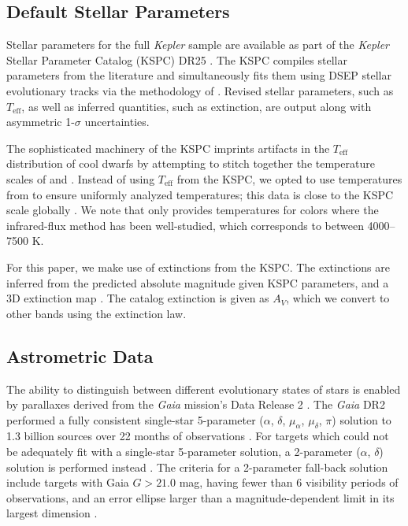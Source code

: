\documentclass[twocolumn]{aastex6}
\newcommand{\Kepler}{\mbox{\textit{Kepler}}}
\newcommand{\Gaia}{\mbox{\textit{Gaia}}}
\newcommand{\Teff}{\ensuremath{T_{\textrm{eff}}}}
\begin{document}
\subsection{Default Stellar Parameters}

Stellar parameters for the full \Kepler{} sample are available as part of the
\Kepler{} Stellar Parameter Catalog (KSPC) DR25 \citep{Mathur17}. The KSPC
compiles stellar parameters from the literature and simultaneously fits them
using DSEP stellar evolutionary tracks \citep{Dotter08} via the methodology of
\citet{Huber14}. Revised stellar parameters, such as \Teff, as well as 
inferred quantities, such as extinction, are output along with asymmetric
1-\(\sigma\) uncertainties. 

The sophisticated machinery of the KSPC imprints artifacts in the \Teff{}
distribution of cool dwarfs by attempting to stitch together the temperature
scales of \citet{Pinsonneault12} and \citet{Dressing13}. Instead of using
\Teff{} from the KSPC, we opted to use temperatures from 
\citet{Pinsonneault12} to ensure uniformly analyzed temperatures; this data is
close to the KSPC scale globally \citep{Huber17}. We note that 
\citet{Pinsonneault12} only provides temperatures for colors where the
infrared-flux method has been well-studied, which corresponds to between
4000--7500 K.

For this paper, we make use of extinctions from the KSPC\@. The
extinctions are inferred from the predicted absolute magnitude given KSPC 
parameters, and a 3D extinction map \citep{Amores05}. The catalog extinction 
is given as \(A_V\), which we convert to other bands using the 
\citet{Cardelli89} extinction law. 

\subsection{Astrometric Data}

The ability to distinguish between different evolutionary states of stars is
enabled by parallaxes derived from the \Gaia{} mission's Data Release 2
\citep{Gaia18}. The \Gaia{} DR2 performed a fully consistent single-star
5-parameter (\(\alpha\), \(\delta\), \(\mu_\alpha\), \(\mu_\delta\), \(\pi\))
solution to 1.3 billion sources over 22 months of observations
\citep{Lindegren18}. For targets which could not be adequately fit with a
single-star 5-parameter solution, a 2-parameter (\(\alpha\), \(\delta\))
solution is performed instead \citep{Michalik15}. The criteria for a
2-parameter fall-back solution include targets with Gaia \(G > 21.0\) mag, 
having fewer than 6 visibility periods of observations, and an error ellipse 
larger than a magnitude-dependent limit in its largest dimension 
\citep{Lindegren18}.
\end{document}
